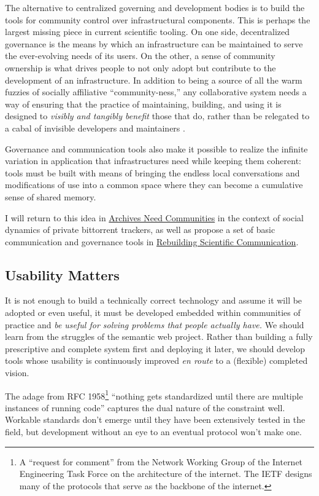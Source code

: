 The alternative to centralized governing and development bodies is to
build the tools for community control over infrastructural components.
This is perhaps the largest missing piece in current scientific tooling.
On one side, decentralized governance is the means by which an
infrastructure can be maintained to serve the ever-evolving needs of its
users. On the other, a sense of community ownership is what drives
people to not only adopt but contribute to the development of an
infrastructure. In addition to being a source of all the warm fuzzies of
socially affiliative ``community-ness,'' any collaborative system needs
a way of ensuring that the practice of maintaining, building, and using
it is designed to \emph{visibly and tangibly benefit} those that do,
rather than be relegated to a cabal of invisible developers and
maintainers \citep{grudinGroupwareSocialDynamics1994, randallDistributedOntologyBuilding2011} .

Governance and communication tools also make it possible to realize the
infinite variation in application that infrastructures need while
keeping them coherent: tools must be built with means of bringing the
endless local conversations and modifications of use into a common space
where they can become a cumulative sense of shared memory.

I will return to this idea in
\protect\hyperlink{archives-need-communities}{Archives Need Communities}
in the context of social dynamics of private bittorrent trackers, as
well as propose a set of basic communication and governance tools in
\protect\hyperlink{rebuilding-scientific-communication}{Rebuilding
Scientific Communication}.

\hypertarget{usability-matters}{%
\subsection{Usability Matters}\label{usability-matters}}

It is not enough to build a technically correct technology and assume it
will be adopted or even useful, it must be developed embedded within
communities of practice and \emph{be useful for solving problems that
people actually have.} We should learn from the struggles of the
semantic web project. Rather than building a fully prescriptive and
complete system first and deploying it later, we should develop tools
whose usability is continuously improved \emph{en route} to a (flexible)
completed vision.

The adage from RFC 1958\footnote{A ``request for comment'' from the
  Network Working Group of the Internet Engineering Task Force on the
  architecture of the internet. The IETF designs many of the protocols
  that serve as the backbone of the internet.} ``nothing gets
standardized until there are multiple instances of running code'' \citep{carpenterRFC1958Architectural1996}  captures the dual nature of
the constraint well. Workable standards don't emerge until they have
been extensively tested in the field, but development without an eye to
an eventual protocol won't make one.

